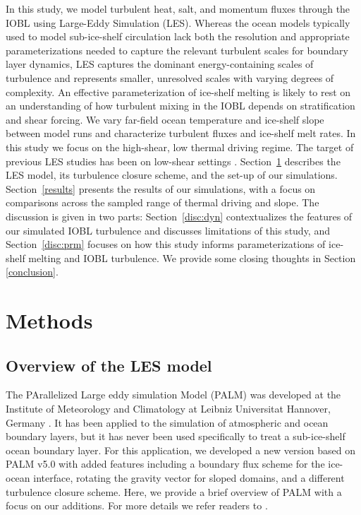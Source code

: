 \documentclass[draft]{styles/agujournal2019}
\begin{document}
In this study, we model turbulent heat, salt, and momentum fluxes through the IOBL using Large-Eddy Simulation (LES). Whereas the ocean models typically used to model sub-ice-shelf circulation lack both the resolution and appropriate parameterizations needed to capture the relevant turbulent scales for boundary layer dynamics, LES captures the dominant energy-containing scales of turbulence and represents smaller, unresolved scales with varying degrees of complexity. An effective parameterization of ice-shelf melting is likely to rest on an understanding of how turbulent mixing in the IOBL depends on stratification and shear forcing. We vary far-field ocean temperature and ice-shelf slope between model runs and characterize turbulent fluxes and ice-shelf melt rates. In this study we focus on the high-shear, low thermal driving regime. The target of previous LES studies has been on low-shear settings \cite{vreugdenhil_stratification_2019, middleton_numerical_2021}. Section~\ref{meth} describes the LES model, its turbulence closure scheme, and the set-up of our simulations. Section~\ref{results} presents the results of our simulations, with a focus on comparisons across the sampled range of thermal driving and slope. The discussion is given in two parts: Section~\ref{disc:dyn} contextualizes the features of our simulated IOBL turbulence and discusses limitations of this study, and Section~\ref{disc:prm} focuses on how this study informs parameterizations of ice-shelf melting and IOBL turbulence. We provide some closing thoughts in Section \ref{conclusion}.

\section{Methods}\label{meth}

\subsection{Overview of the LES model}

The PArallelized Large eddy simulation Model (PALM) was developed at the Institute of Meteorology and Climatology at Leibniz Universitat Hannover, Germany \cite{raasch_palm-large-eddy_2001}. It has been applied to the simulation of atmospheric and ocean boundary layers, but it has never been used specifically to treat a sub-ice-shelf ocean boundary layer. For this application, we developed a new version based on PALM v5.0 \cite{maronga_parallelized_2015} with added features including a boundary flux scheme for the ice-ocean interface, rotating the gravity vector for sloped domains, and a different turbulence closure scheme. Here, we provide a brief overview of PALM with a focus on our additions. For more details we refer readers to .
\end{document}
